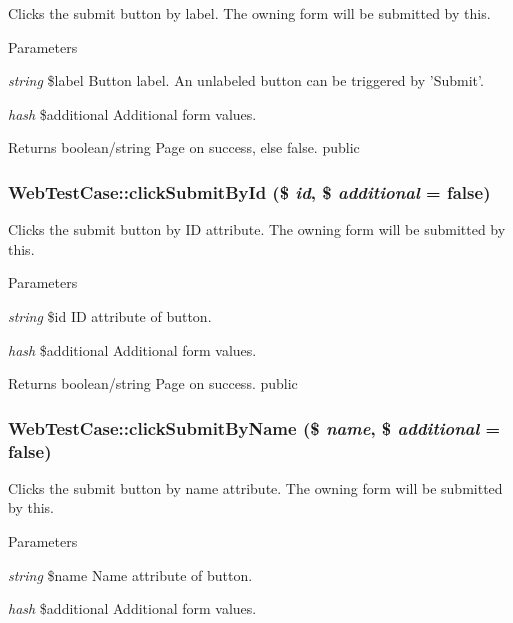 \label{class_web_test_case_a7c7a1adc6ce99397bda5914edca76eaf}
Clicks the submit button by label. The owning form will be submitted by this. 
\begin{DoxyParams}{Parameters}
\item[{\em string}]\$label Button label. An unlabeled button can be triggered by 'Submit'. \item[{\em hash}]\$additional Additional form values. \end{DoxyParams}
\begin{DoxyReturn}{Returns}
boolean/string Page on success, else false.  public 
\end{DoxyReturn}
\hypertarget{class_web_test_case_a8de6c0c32b24d21b3d077487acbf4237}{
\subsubsection[{clickSubmitById}]{\setlength{\rightskip}{0pt plus 5cm}WebTestCase::clickSubmitById (\$ {\em id}, \/  \$ {\em additional} = {\ttfamily false})}}
\label{class_web_test_case_a8de6c0c32b24d21b3d077487acbf4237}
Clicks the submit button by ID attribute. The owning form will be submitted by this. 
\begin{DoxyParams}{Parameters}
\item[{\em string}]\$id ID attribute of button. \item[{\em hash}]\$additional Additional form values. \end{DoxyParams}
\begin{DoxyReturn}{Returns}
boolean/string Page on success.  public 
\end{DoxyReturn}
\hypertarget{class_web_test_case_ad23d94f7be9a92d07c36772b302cd495}{
\subsubsection[{clickSubmitByName}]{\setlength{\rightskip}{0pt plus 5cm}WebTestCase::clickSubmitByName (\$ {\em name}, \/  \$ {\em additional} = {\ttfamily false})}}
\label{class_web_test_case_ad23d94f7be9a92d07c36772b302cd495}
Clicks the submit button by name attribute. The owning form will be submitted by this. 
\begin{DoxyParams}{Parameters}
\item[{\em string}]\$name Name attribute of button. \item[{\em hash}]\$additional Additional form values. \end{DoxyParams}
